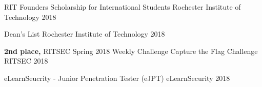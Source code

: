 

\vspace{-2.0mm}

\begin{cvhonors}

  \cvhonor
    {} %
    {RIT Founders Scholarship for International Students} %
    {Rochester Institute of Technology} %
    {2018} %

  \cvhonor
    {} %
    {Dean's List} %
    {Rochester Institute of Technology} %
    {2018} %
    
  \cvhonor
    {} %
    {{\bf2nd place,} RITSEC Spring 2018 Weekly Challenge Capture the Flag Challenge} %
    {RITSEC} %
    {2018} %


\end{cvhonors}

\vspace{-3.0mm}

\begin{cvhonors}

  \cvhonor
    {} %
    {eLearnSeucrity - Junior Penetration Tester (eJPT)} %
    {eLearnSecurity} %
    {2018} %


\end{cvhonors}